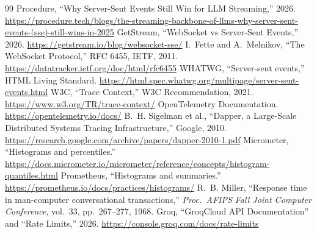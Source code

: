 \documentclass[11pt]{article}
\begin{document}
\begin{thebibliography}{99}
 Procedure, ``Why Server-Sent Events Still Win for LLM Streaming,'' 2026. \url{https://procedure.tech/blogs/the-streaming-backbone-of-llms-why-server-sent-events-(sse)-still-wins-in-2025}
 GetStream, ``WebSocket vs Server-Sent Events,'' 2026. \url{https://getstream.io/blog/websocket-sse/}
 I.~Fette and A.~Melnikov, ``The WebSocket Protocol,'' RFC 6455, IETF, 2011. \url{https://datatracker.ietf.org/doc/html/rfc6455}
 WHATWG, ``Server-sent events,'' HTML Living Standard. \url{https://html.spec.whatwg.org/multipage/server-sent-events.html}
 W3C, ``Trace Context,'' W3C Recommendation, 2021. \url{https://www.w3.org/TR/trace-context/}
 OpenTelemetry Documentation. \url{https://opentelemetry.io/docs/}
 B.~H. Sigelman et al., ``Dapper, a Large-Scale Distributed Systems Tracing Infrastructure,'' Google, 2010. \url{https://research.google.com/archive/papers/dapper-2010-1.pdf}
 Micrometer, ``Histograms and percentiles.'' \url{https://docs.micrometer.io/micrometer/reference/concepts/histogram-quantiles.html}
 Prometheus, ``Histograms and summaries.'' \url{https://prometheus.io/docs/practices/histograms/}
 R.~B. Miller, ``Response time in man-computer conversational transactions,'' \emph{Proc.\ AFIPS Fall Joint Computer Conference}, vol.~33, pp.~267--277, 1968.
 Groq, ``GroqCloud API Documentation'' and ``Rate Limits,'' 2026. \url{https://console.groq.com/docs/rate-limits}
\end{thebibliography}
\end{document}
